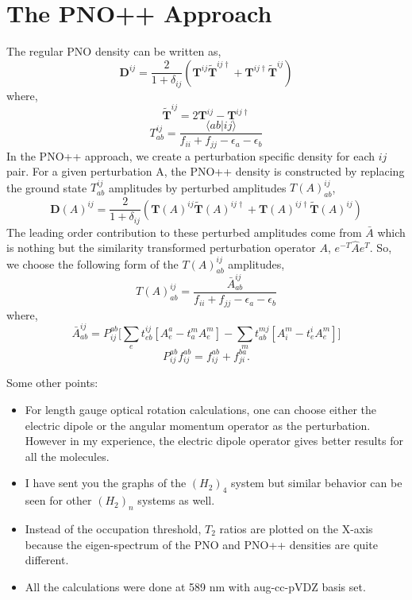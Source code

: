 \documentclass[12pt]{article}
\begin{document}
\section{The PNO++ Approach}
The regular PNO density can be written as,
\begin{equation}
\bm{D}^{ij} = \frac{2}{1+\delta_{ij}} (\bm{T}^{ij}\tilde{\bm{T}}^{ij\dagger} + \bm{T}^{ij\dagger}\tilde{\bm{T}}^{ij})
\end{equation}
where, 
\begin{equation}
\tilde{\bm{T}}^{ij} = 2\bm{T}^{ij} - \bm{T}^{ij\dagger}
\end{equation} 
\begin{equation}
T^{ij}_{ab} = \frac{\langle ab|ij \rangle}{f_{ii} + f_{jj} - \epsilon_a - \epsilon_b}
\end{equation} 
In the PNO++ approach, we create a perturbation specific density for each $ij$ pair. For a given
perturbation A, the PNO++ density is constructed by replacing the ground state $T^{ij}_{ab}$ amplitudes 
by perturbed amplitudes $T(A)^{ij}_{ab}$,
\begin{equation}
\bm{D}(A)^{ij} = \frac{2}{1+\delta_{ij}} (\bm{T}(A)^{ij}\bm{\tilde{T}}(A)^{ij\dagger} + \bm{T}(A)^{ij\dagger}\bm{\tilde{T}}(A)^{ij})
\end{equation}
The leading order contribution to these perturbed amplitudes come from $\bar{A}$ which is nothing but 
the similarity transformed perturbation operator $A$, $e^{-T}\hat{A}e^{T}$. So, we choose the following
form of the $T(A)^{ij}_{ab}$ amplitudes,
\begin{equation}
T(A)^{ij}_{ab} =  \frac{\bar{A}^{ij}_{ab}}{f_{ii} + f_{jj} - \epsilon_a - \epsilon_b} 
\end{equation} 
where,
\begin{equation}
\bar{A}^{ij}_{ab} = P_{ij}^{ab}\bigg[\sum_e t^{ij}_{eb}[A^a_e - t^m_a A^m_e] -\sum_m t^{mj}_{ab}[A^m_i - t^i_e A^m_e]\bigg]
\end{equation} 
\begin{equation}
P_{ij}^{ab} f_{ij}^{ab} = f_{ij}^{ab} + f_{ji}^{ba} .
\end{equation}

Some other points:
\begin{itemize}
\item For length gauge optical rotation calculations, one can choose either the electric dipole or the angular momentum operator as the perturbation. However in my experience, the electric dipole operator gives better results for all the molecules.
\item I have sent you the graphs of the $(H_2)_4$ system but similar behavior can be seen for other $(H_2)_n$ systems as well. 
\item Instead of the occupation threshold, $T_2$ ratios are plotted on the X-axis because the eigen-spectrum of the PNO and PNO++ densities
are quite different.
\item All the calculations were done at 589 nm with aug-cc-pVDZ basis set.
\end{itemize}
\end{document}
